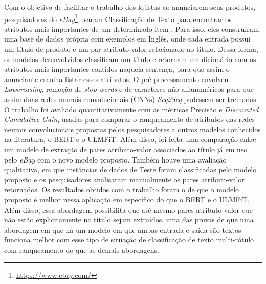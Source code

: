 Com o objetivo de facilitar o trabalho dos lojistas ao anunciarem seus produtos, pesquisadores do \textit{eBay}\footnote{\url{https://www.ebay.com/}} usaram Classificação de Texto para encontrar os atributos mais importantes de um determinado item \cite{relacionado_ing}. Para isso, eles construíram uma base de dados própria com exemplos em Inglês, onde cada entrada possui um título de produto e um par atributo-valor relacionado ao título. Dessa forma, os modelos desenvolvidos classificam um título e retornam um dicionário com os atributos mais importantes contidos naquela sentença, para que assim o anunciante escolha listar esses atributos. O pré-processamento envolveu \textit{Lowercasing}, remoção de \textit{stop-words} e de caracteres não-alfanuméricos para que assim duas redes neurais convolucionais (CNNs) \textit{Seq2Seq} pudessem ser treinadas. O trabalho foi avaliado quantitativamente com as métricas Precisão e \textit{Discounted Cumulative Gain}, usadas para comparar o ranqueamento de atributos das redes neurais convolucionais propostas pelos pesquisadores a outros modelos conhecidos na literatura, o BERT e o ULMFiT. Além disso, foi feita uma comparação entre um modelo de extração de pares atributo-valor associados ao título já em uso pelo \textit{eBay} com o novo modelo proposto. Também houve uma avaliação qualitativa, em que instâncias de dados de Teste foram classificadas pelo modelo proposto e os pesquisadores analisaram manualmente os pares atributo-valor retornados. Os resultados obtidos com o trabalho foram o de que o modelo proposto é melhor nessa aplicação em específico do que o BERT e o ULMFiT. Além disso, essa abordagem possibilita que até mesmo pares atributo-valor que não estão explicitamente no título sejam extraídos, uma das provas de que uma abordagem em que há um modelo em que ambas entrada e saída são textos funciona melhor com esse tipo de situação de classificação de texto multi-rótulo com ranqueamento do que as demais abordagens.

